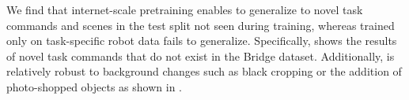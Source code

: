  We find that internet-scale pretraining enables \model to generalize to novel task commands and scenes in the test split not seen during training, whereas \model trained only on task-specific robot data fails to generalize. Specifically,  shows the %
results of novel task commands that do not exist in the Bridge dataset. Additionally, \model is relatively robust to background changes such as black cropping or the addition of photo-shopped objects as shown in .


